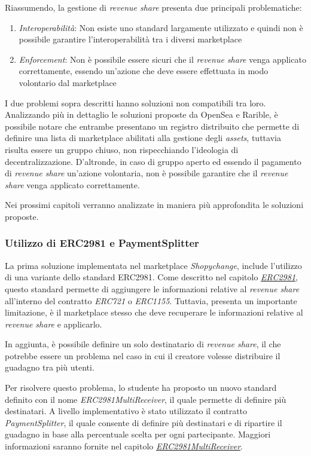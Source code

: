 Riassumendo, la gestione di \textit{revenue share} presenta due principali problematiche:
\begin{enumerate}
    \item \textit{Interoperabilità}: Non esiste uno standard largamente utilizzato e quindi non è possibile garantire l'interoperabilità tra i diversi marketplace
    \item \textit{Enforcement}: Non è possibile essere sicuri che il \textit{revenue share} venga applicato correttamente, essendo un'azione che deve essere effettuata in modo volontario dal marketplace 
\end{enumerate}

I due problemi sopra descritti hanno soluzioni non compatibili tra loro. Analizzando più in dettaglio le soluzioni proposte da OpenSea e Rarible, è possibile notare che entrambe presentano un registro distribuito che permette di definire una lista di marketplace abilitati alla gestione degli \textit{assets}, tuttavia risulta essere un gruppo chiuso, non rispecchiando l'ideologia di decentralizzazione. D'altronde, in caso di gruppo aperto ed essendo il pagamento di \textit{revenue share} un'azione volontaria, non è possibile garantire che il \textit{revenue share} venga applicato correttamente.

Nei prossimi capitoli verranno analizzate in maniera più approfondita le soluzioni proposte.

\subsubsection{Utilizzo di ERC2981 e PaymentSplitter}
\label{sec:utilizzo-erc2981-payment-splitter}

La prima soluzione implementata nel marketplace \textit{Shopychange}, include l'utilizzo di una variante dello standard ERC2981. Come descritto nel capitolo \hyperref[sec:erc2981]{\textit{ERC2981}}, questo standard permette di aggiungere le informazioni relative al \textit{revenue share} all'interno del contratto \textit{ERC721} o \textit{ERC1155}. Tuttavia, presenta un importante limitazione, è il marketplace stesso che deve recuperare le informazioni relative al \textit{revenue share} e applicarlo.

In aggiunta, è possibile definire un solo destinatario di \textit{revenue share}, il che potrebbe essere un problema nel caso in cui il creatore volesse distribuire il guadagno tra più utenti. 

Per risolvere questo problema, lo studente ha proposto un nuovo standard definito con il nome \textit{ERC2981MultiReceiver}, il quale permette di definire più destinatari. A livello implementativo è stato utilizzato il contratto \textit{PaymentSplitter}, il quale consente di definire più destinatari e di ripartire il guadagno in base alla percentuale scelta per ogni partecipante. Maggiori informazioni saranno fornite nel capitolo \hyperref[sec:erc2981-multi-receiver]{\textit{ERC2981MultiReceiver}}.

